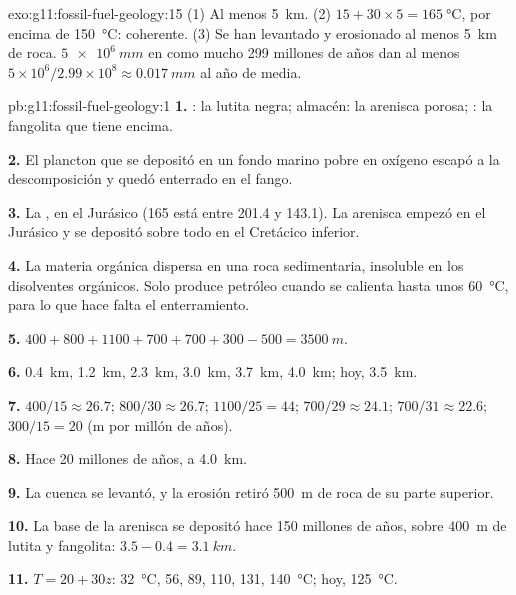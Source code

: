 \begin{solution}{exo:g11:fossil-fuel-geology:15}
(1) Al menos \qty{5}{km}. (2) $15 + 30 \times 5 = \qty{165}{\degreeCelsius}$,
por encima de \qty{150}{\degreeCelsius}: coherente. (3) Se han levantado y
erosionado al menos \qty{5}{km} de roca. $\qty{5e6}{mm}$ en como mucho
\num{299} millones de años dan al menos $5 \times 10^6/2.99 \times 10^8
\approx \qty{0.017}{mm}$ al año de media.
\end{solution}

\begin{solution}{pb:g11:fossil-fuel-geology:1}
\textbf{1.} : la lutita negra; almacén: la arenisca porosa;
: la fangolita que tiene encima.

\textbf{2.} El plancton que se depositó en un fondo marino pobre en oxígeno
escapó a la descomposición y quedó enterrado en el fango.

\textbf{3.} La , en el Jurásico (165 está entre 201.4 y
143.1). La arenisca empezó en el Jurásico y se depositó sobre todo en el
Cretácico inferior.

\textbf{4.} La materia orgánica dispersa en una roca sedimentaria, insoluble en
los disolventes orgánicos. Solo produce petróleo cuando se calienta hasta unos
\qty{60}{\degreeCelsius}, para lo que hace falta el enterramiento.

\textbf{5.} $400 + 800 + 1100 + 700 + 700 + 300 - 500 = \qty{3500}{m}$.

\textbf{6.} \qty{0.4}{km}, \qty{1.2}{km}, \qty{2.3}{km}, \qty{3.0}{km},
\qty{3.7}{km}, \qty{4.0}{km}; hoy, \qty{3.5}{km}.

\textbf{7.} $400/15 \approx 26.7$; $800/30 \approx 26.7$; $1100/25 = 44$;
$700/29 \approx 24.1$; $700/31 \approx 22.6$; $300/15 = 20$ (\unit{m} por
millón de años).

\textbf{8.} Hace 20 millones de años, a \qty{4.0}{km}.

\textbf{9.} La cuenca se levantó, y la erosión retiró \qty{500}{m} de roca de
su parte superior.

\textbf{10.} La base de la arenisca se depositó hace 150 millones de años,
sobre \qty{400}{m} de lutita y fangolita: $3.5 - 0.4 = \qty{3.1}{km}$.

\textbf{11.} $T = 20 + 30 z$: \qty{32}{\degreeCelsius}, \num{56}, \num{89},
\num{110}, \num{131}, \qty{140}{\degreeCelsius}; hoy,
\qty{125}{\degreeCelsius}.


\end{solution}
